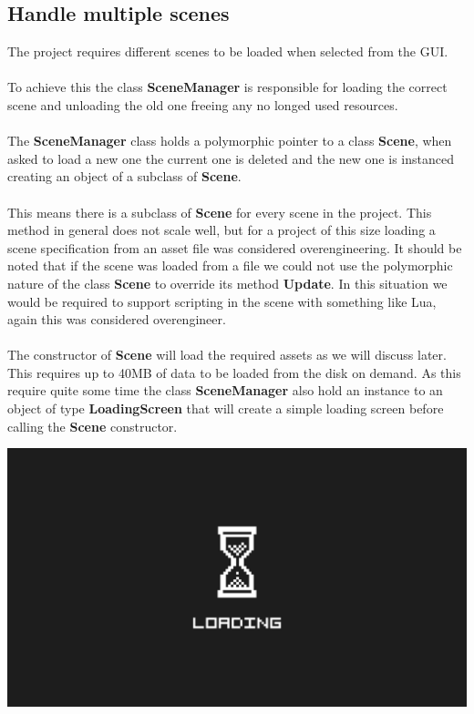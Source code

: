 \documentclass[12pt, a4paper]{article}
\begin{document}
\subsection{Handle multiple scenes}
The project requires different scenes to be loaded when selected from the GUI.\\\\
To achieve this the class \textbf{SceneManager} is responsible for loading the correct scene and unloading the old one
freeing any no longed used resources.\\\\
The \textbf{SceneManager} class holds a polymorphic pointer to a class \textbf{Scene}, when asked to load a new one
the current one is deleted and the new one is instanced creating an object of a subclass of \textbf{Scene}.\\\\
This means there is a subclass of \textbf{Scene} for every scene in the project. This method in general does not
scale well, but for a project of this size loading a scene specification from an asset file was considered overengineering.
It should be noted that if the scene was loaded from a file we could not use the polymorphic nature of the class
\textbf{Scene} to override its method \textbf{Update}. In this situation we would be required to support scripting in the
scene with something like Lua, again this was considered overengineer.\\\\
The constructor of \textbf{Scene} will load the required assets as we will discuss later. This requires up to 40MB of 
data to be loaded from the disk on demand. As this require quite some time the class \textbf{SceneManager} also
hold an instance to an object of type \textbf{LoadingScreen} that will create a simple loading screen before calling
the \textbf{Scene} constructor.
\begin{center}
    \centering
    \includegraphics[width=1.0\textwidth]{img/loading.png}
\end{center}
\end{document}
